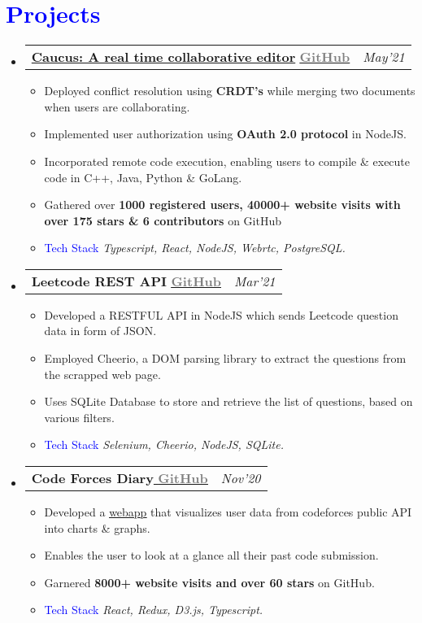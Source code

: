 \documentclass[letterpaper,11pt]{article}
\makeatletter
\newcommand{\resumeItem}[1]{
  \item\small{
    {#1 \vspace{-2pt}}
  }
}
\newcommand{\resumeProjectHeading}[2]{
    \item
    \begin{tabular*}{1.001\textwidth}{l@{\extracolsep{\fill}}r}
      \small#1 & \textit{\small #2}\\
    \end{tabular*}\vspace{-7pt}
}
\newcommand{\resumeSubHeadingListStart}{\begin{itemize}[leftmargin=0.0in, label={}]}
\newcommand{\resumeSubHeadingListEnd}{\end{itemize}}
\newcommand{\resumeItemListStart}{\begin{itemize}}
\newcommand{\resumeItemListEnd}{\end{itemize}\vspace{-5pt}}
\makeatother
\begin{document}
\section{\Large \textcolor{blue}{Projects}}
    \vspace{-5pt}
    \resumeSubHeadingListStart
      \resumeProjectHeading
          {\textbf{\href{https://github.com/Rishabh-malhotraa/caucus}{Caucus: A real time collaborative editor}} \href{https://github.com/Rishabh-malhotraa/caucus}{\underline{\textbf{\textcolor{gray}{GitHub}}}}}{May'21}
          \resumeItemListStart
            \resumeItem{Deployed conflict resolution using \textbf{CRDT's} while merging two documents when users are collaborating.}
            \resumeItem{Implemented user authorization using \textbf{OAuth 2.0 protocol} in NodeJS.}
            \resumeItem{Incorporated remote code execution, enabling users to compile \& execute code in C++, Java, Python \& GoLang.}
            \resumeItem{Gathered over \textbf{1000 registered users, 40000+ website visits with over 175 stars \& 6 contributors} on GitHub}
            \resumeItem{\textcolor{blue}{Tech Stack} \emph{Typescript, React, NodeJS, Webrtc, PostgreSQL.}}
          \resumeItemListEnd
          \vspace{-10pt}
          \resumeProjectHeading
          {\textbf{Leetcode REST  API }\href{https://github.com/Rishabh-malhotraa/caucus-server}{\underline{\textbf{\textcolor{gray}{GitHub}}}}}{Mar'21}
          \resumeItemListStart
            \resumeItem{Developed a RESTFUL API in NodeJS which sends Leetcode question data in form of JSON.}
            \resumeItem{Employed Cheerio, a DOM parsing library to extract the questions from the scrapped web page.}
            \resumeItem{Uses SQLite Database to store and retrieve the list of questions, based on various filters.}
            \resumeItem{\textcolor{blue}{Tech Stack} \emph{Selenium, Cheerio, NodeJS, SQLite.}}
            
            \vspace{+8pt}
          \resumeItemListEnd
              \vspace{-20pt}
          \resumeProjectHeading
              {\textbf{Code Forces Diary}\href{https://github.com/Rishabh-malhotraa/codeforces-diary}{ \underline{\textbf{\textcolor{gray}{GitHub}}}}} {Nov'20}
              \resumeItemListStart
                \resumeItem{Developed a \href{https://codeforces-diary.netlify.app/}{\underline{webapp}} that visualizes user data from codeforces public API into charts \& graphs.}
                \resumeItem{Enables the user to look at a glance all their past code submission.}
                \resumeItem{Garnered \textbf{8000+ website visits and over 60 stars} on  GitHub.}
                \resumeItem{\textcolor{blue}{Tech Stack} \emph{React, Redux, D3.js, Typescript.}}
              \resumeItemListEnd           
              \resumeSubHeadingListEnd
\vspace{-12pt}
\end{document}
